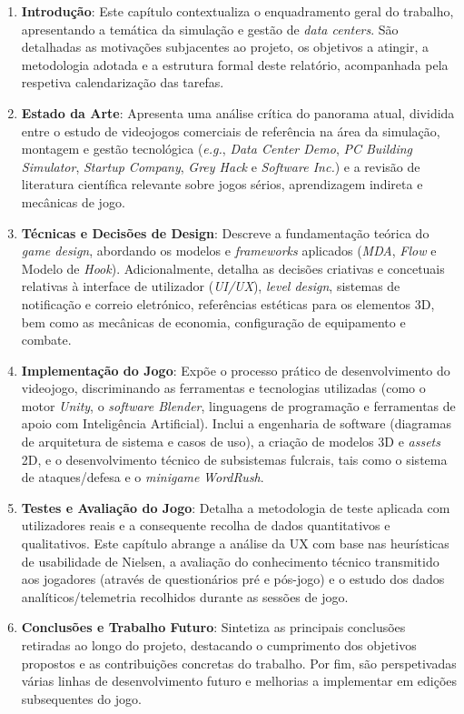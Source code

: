 \begin{enumerate}
    \item \textbf{Introdução}: Este capítulo contextualiza o enquadramento geral do trabalho, apresentando a temática da simulação e gestão de \textit{data centers}. São detalhadas as motivações subjacentes ao projeto, os objetivos a atingir, a metodologia adotada e a estrutura formal deste relatório, acompanhada pela respetiva calendarização das tarefas.

    \item \textbf{Estado da Arte}: Apresenta uma análise crítica do panorama atual, dividida entre o estudo de videojogos comerciais de referência na área da simulação, montagem e gestão tecnológica (\textit{e.g.}, \textit{Data Center Demo}, \textit{PC Building Simulator}, \textit{Startup Company}, \textit{Grey Hack} e \textit{Software Inc.}) e a revisão de literatura científica relevante sobre jogos sérios, aprendizagem indireta e mecânicas de jogo.

    \item \textbf{Técnicas e Decisões de Design}: Descreve a fundamentação teórica do \textit{game design}, abordando os modelos e \textit{frameworks} aplicados (\textit{MDA}, \textit{Flow} e Modelo de \textit{Hook}). Adicionalmente, detalha as decisões criativas e concetuais relativas à interface de utilizador (\textit{UI/UX}), \textit{level design}, sistemas de notificação e correio eletrónico, referências estéticas para os elementos 3D, bem como as mecânicas de economia, configuração de equipamento e combate.

    \item \textbf{Implementação do Jogo}: Expõe o processo prático de desenvolvimento do videojogo, discriminando as ferramentas e tecnologias utilizadas (como o motor \textit{Unity}, o \textit{software Blender}, linguagens de programação e ferramentas de apoio com Inteligência Artificial). Inclui a engenharia de software (diagramas de arquitetura de sistema e casos de uso), a criação de modelos 3D e \textit{assets} 2D, e o desenvolvimento técnico de subsistemas fulcrais, tais como o sistema de ataques/defesa e o \textit{minigame} \textit{WordRush}.

    \item \textbf{Testes e Avaliação do Jogo}: Detalha a metodologia de teste aplicada com utilizadores reais e a consequente recolha de dados quantitativos e qualitativos. Este capítulo abrange a análise da \ac{UX} com base nas heurísticas de usabilidade de Nielsen, a avaliação do conhecimento técnico transmitido aos jogadores (através de questionários pré e pós-jogo) e o estudo dos dados analíticos/telemetria recolhidos durante as sessões de jogo.

    \item \textbf{Conclusões e Trabalho Futuro}: Sintetiza as principais conclusões retiradas ao longo do projeto, destacando o cumprimento dos objetivos propostos e as contribuições concretas do trabalho. Por fim, são perspetivadas várias linhas de desenvolvimento futuro e melhorias a implementar em edições subsequentes do jogo.
\end{enumerate}

